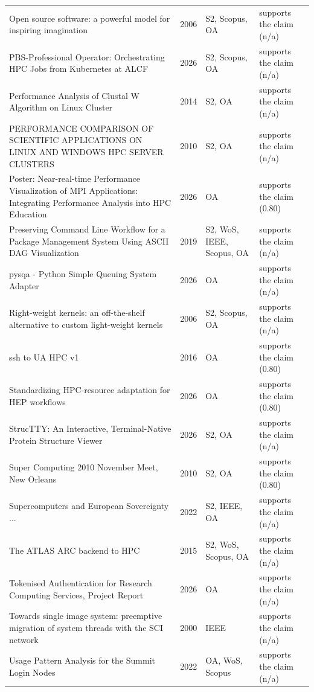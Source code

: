 \begin{longtable}{@{}%
  >{\raggedright\arraybackslash}p{}c%
  >{\raggedright\arraybackslash}p{}%
  >{\raggedright\arraybackslash}p{}@{}}
Open source software: a powerful model for inspiring imagination & 2006 & S2, Scopus, OA & supports the claim (n/a) \\
PBS-Professional Operator: Orchestrating HPC Jobs from Kubernetes at ALCF & 2026 & S2, Scopus, OA & supports the claim (n/a) \\
Performance Analysis of Clustal W Algorithm on Linux Cluster & 2014 & S2, OA & supports the claim (n/a) \\
PERFORMANCE COMPARISON OF SCIENTIFIC APPLICATIONS ON LINUX AND WINDOWS HPC SERVER CLUSTERS & 2010 & S2, OA & supports the claim (n/a) \\
Poster: Near-real-time Performance Visualization of MPI Applications: Integrating Performance Analysis into HPC Education & 2026 & OA & supports the claim (0.80) \\
Preserving Command Line Workflow for a Package Management System Using ASCII DAG Visualization & 2019 & S2, WoS, IEEE, Scopus, OA & supports the claim (n/a) \\
pysqa - Python Simple Queuing System Adapter & 2026 & OA & supports the claim (n/a) \\
Right-weight kernels: an off-the-shelf alternative to custom light-weight kernels & 2006 & S2, Scopus, OA & supports the claim (n/a) \\
ssh to UA HPC v1 & 2016 & OA & supports the claim (0.80) \\
Standardizing HPC-resource adaptation for HEP workflows & 2026 & OA & supports the claim (0.80) \\
StrucTTY: An Interactive, Terminal-Native Protein Structure Viewer & 2026 & S2, OA & supports the claim (n/a) \\
Super Computing 2010 November Meet, New Orleans & 2010 & S2, OA & supports the claim (0.80) \\
Supercomputers and European Sovereignty ... & 2022 & S2, IEEE, OA & supports the claim (n/a) \\
The ATLAS ARC backend to HPC & 2015 & S2, WoS, Scopus, OA & supports the claim (n/a) \\
Tokenised Authentication for Research Computing Services, Project Report & 2026 & OA & supports the claim (n/a) \\
Towards single image system: preemptive migration of system threads with the SCI network & 2000 & IEEE & supports the claim (n/a) \\
Usage Pattern Analysis for the Summit Login Nodes & 2022 & OA, WoS, Scopus & supports the claim (n/a) \\

\end{longtable}
